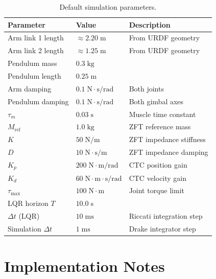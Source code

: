 \documentclass[11pt, a4paper]{article}
\begin{document}
\begin{table}[H]
\centering
\caption{Default simulation parameters.}
\renewcommand{\arraystretch}{1.3}
\begin{tabular}{lll}
\toprule
\textbf{Parameter} & \textbf{Value} & \textbf{Description} \\
\midrule
Arm link 1 length   & $\approx 2.20\;\mathrm{m}$ & From URDF geometry \\
Arm link 2 length   & $\approx 1.25\;\mathrm{m}$ & From URDF geometry \\
Pendulum mass       & $0.3\;\mathrm{kg}$         & \\
Pendulum length     & $0.25\;\mathrm{m}$         & \\
Arm damping         & $0.1\;\mathrm{N\cdot s/rad}$ & Both joints \\
Pendulum damping    & $0.1\;\mathrm{N\cdot s/rad}$ & Both gimbal axes \\
$\tau_m$            & $0.03\;\mathrm{s}$          & Muscle time constant \\
$M_{\mathrm{ref}}$  & $1.0\;\mathrm{kg}$          & ZFT reference mass \\
$K$                 & $50\;\mathrm{N/m}$          & ZFT impedance stiffness \\
$D$                 & $10\;\mathrm{N\cdot s/m}$   & ZFT impedance damping \\
$K_p$               & $200\;\mathrm{N\cdot m/rad}$        & CTC position gain \\
$K_d$               & $60\;\mathrm{N\cdot m\cdot s/rad}$  & CTC velocity gain \\
$\tau_{\max}$       & $100\;\mathrm{N\cdot m}$    & Joint torque limit \\
LQR horizon $T$     & $10.0\;\mathrm{s}$          & \\
$\Delta t$ (LQR)    & $10\;\mathrm{ms}$           & Riccati integration step \\
Simulation $\Delta t$ & $1\;\mathrm{ms}$          & Drake integrator step \\
\bottomrule
\end{tabular}
\end{table}

\section{Implementation Notes}
\end{document}
